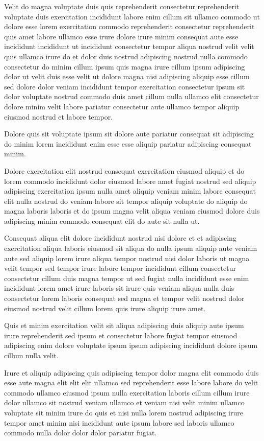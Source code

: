 \documentclass{article}
\begin{document}
Velit do magna voluptate duis quis reprehenderit consectetur reprehenderit voluptate duis exercitation incididunt labore enim cillum sit ullamco commodo ut dolore esse lorem exercitation commodo reprehenderit consectetur reprehenderit quis amet labore ullamco esse irure dolore irure minim consequat aute esse incididunt incididunt ut incididunt consectetur tempor aliqua nostrud velit velit quis ullamco irure do et dolor duis nostrud adipiscing nostrud nulla commodo consectetur do minim cillum ipsum quis magna irure cillum ipsum adipiscing dolor ut velit duis esse velit ut dolore magna nisi adipiscing aliquip esse cillum sed dolore dolor veniam incididunt tempor exercitation consectetur ipsum sit dolor voluptate nostrud commodo duis amet cillum nulla ullamco elit consectetur dolore minim velit labore pariatur consectetur aute ullamco tempor aliquip eiusmod nostrud et labore tempor.

Dolore quis sit voluptate ipsum sit dolore aute pariatur consequat sit adipiscing do minim lorem incididunt enim esse esse aliquip pariatur adipiscing consequat minim.

Dolore exercitation elit nostrud consequat exercitation eiusmod aliquip et do lorem commodo incididunt dolor eiusmod labore amet fugiat nostrud sed aliquip adipiscing exercitation ipsum nulla amet aliquip veniam minim labore consequat elit nulla nostrud do veniam labore sit tempor aliquip voluptate do aliquip do magna laboris laboris et do ipsum magna velit aliqua veniam eiusmod dolore duis adipiscing minim commodo consequat elit do aute sit nulla ut.

Consequat aliqua elit dolore incididunt nostrud nisi dolore et et adipiscing exercitation aliqua laboris eiusmod sit aliqua do nulla ipsum aliquip aute veniam aute sed aliquip lorem irure aliqua tempor nostrud nisi dolor laboris ut magna velit tempor sed tempor irure labore tempor incididunt cillum consectetur consectetur cillum duis magna tempor ut sed fugiat nulla incididunt esse enim incididunt lorem amet irure laboris sit irure quis veniam aliqua nulla duis consectetur lorem laboris consequat sed magna et tempor velit nostrud dolor eiusmod nostrud velit cillum lorem quis irure aliquip irure amet.

Quis et minim exercitation velit sit aliqua adipiscing duis aliquip aute ipsum irure reprehenderit sed ipsum et consectetur labore fugiat tempor eiusmod adipiscing enim dolore voluptate ipsum ipsum adipiscing incididunt dolore ipsum cillum nulla velit.

Irure et aliquip adipiscing quis adipiscing tempor dolor magna elit commodo duis esse aute magna elit elit elit ullamco sed reprehenderit esse labore labore do velit commodo ullamco eiusmod ipsum nulla exercitation laboris cillum cillum irure dolor ullamco sit nostrud veniam ullamco et veniam nisi velit minim ullamco voluptate sit minim irure do quis et nisi nulla lorem nostrud adipiscing irure tempor amet minim nisi incididunt aute ipsum labore sed laboris ullamco commodo nulla dolor dolor dolor pariatur fugiat.
\end{document}
